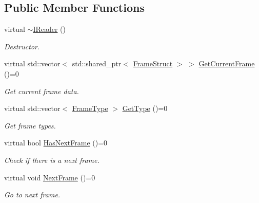 \subsection*{Public Member Functions}
\begin{DoxyCompactItemize}
\item 
\mbox{\label{classmoetsi_1_1ssp_1_1IReader_ae1332862a7d81d99563f111ae36e142f}} 
virtual \hyperlink{classmoetsi_1_1ssp_1_1IReader_ae1332862a7d81d99563f111ae36e142f}{$\sim$\+I\+Reader} ()
\begin{DoxyCompactList}\small\item\em Destructor. \end{DoxyCompactList}\item 
\mbox{\label{classmoetsi_1_1ssp_1_1IReader_a357439182128e3911d77335c136035c0}} 
virtual std\+::vector$<$ std\+::shared\+\_\+ptr$<$ \hyperlink{structmoetsi_1_1ssp_1_1FrameStruct}{Frame\+Struct} $>$ $>$ \hyperlink{classmoetsi_1_1ssp_1_1IReader_a357439182128e3911d77335c136035c0}{Get\+Current\+Frame} ()=0
\begin{DoxyCompactList}\small\item\em Get current frame data. \end{DoxyCompactList}\item 
virtual std\+::vector$<$ \hyperlink{namespacemoetsi_1_1ssp_a46efdfa2cd5a28ead465dcc8006b5a87}{Frame\+Type} $>$ \hyperlink{classmoetsi_1_1ssp_1_1IReader_a4116c1931fde7bd66133934ffdca1cce}{Get\+Type} ()=0
\begin{DoxyCompactList}\small\item\em Get frame types. \end{DoxyCompactList}\item 
virtual bool \hyperlink{classmoetsi_1_1ssp_1_1IReader_af9186ba41e136dc4ec3242b5dd55fa04}{Has\+Next\+Frame} ()=0
\begin{DoxyCompactList}\small\item\em Check if there is a next frame. \end{DoxyCompactList}\item 
\mbox{\label{classmoetsi_1_1ssp_1_1IReader_a49e82a786cca55248e27e7fac8f97a17}} 
virtual void \hyperlink{classmoetsi_1_1ssp_1_1IReader_a49e82a786cca55248e27e7fac8f97a17}{Next\+Frame} ()=0
\begin{DoxyCompactList}\small\item\em Go to next frame. \end{DoxyCompactList}\item 

\end{DoxyCompactItemize}

